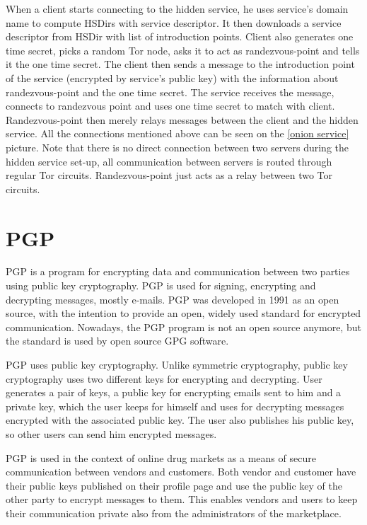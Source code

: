 \documentclass[
  digital, %
  table,   %
  lof,     %
  lot,     %
  oneside
]{fithesis3}
\begin{document}
When a client starts connecting to the hidden service, he uses service's domain name 
to compute HSDirs with service descriptor. It then downloads a service descriptor from HSDir with list
of introduction points. Client also generates one time secret, picks a random Tor node, asks
it to act as randezvous-point and tells it the one time secret. 
The client then sends a message to the introduction point of the service (encrypted by service's public key)
with the information about randezvous-point and the one time secret. The service receives the message, connects 
to randezvous point and uses one time secret to match with client.
Randezvous-point then merely relays messages between the client and the hidden service.
All the connections mentioned above can be seen on the \ref{onion service} picture.
Note that there is no direct connection between two servers during the hidden service set-up,
all communication between servers is routed through regular Tor circuits.
Randezvous-point just acts as a relay between two Tor circuits.

\section{PGP}

PGP \cite{Zimmermann:1995:OPU:202735} is a program for encrypting data
and communication between two parties using public key cryptography.
PGP is used for signing, encrypting and decrypting messages, mostly e-mails.
PGP was developed in 1991 as an open source, with the intention 
to provide an open, widely used standard for encrypted communication.
Nowadays, the PGP program is not an open source anymore, but the standard is used by open source GPG software.

PGP uses public key cryptography. Unlike symmetric cryptography, public key cryptography
uses two different keys for encrypting and decrypting.
User generates a pair of keys, a public key for encrypting emails sent to him and a private key, which the user
 keeps for himself and uses for decrypting messages encrypted with the associated public key.
 The user also publishes his public key, so other users can send him encrypted messages.

PGP is used in the context of online drug markets as a means of secure communication between vendors and customers.
Both vendor and customer have their public keys published on their profile page and use the public key of the other
party to encrypt messages to them. This enables vendors and users to keep their communication private also from the administrators of the marketplace.
\end{document}
